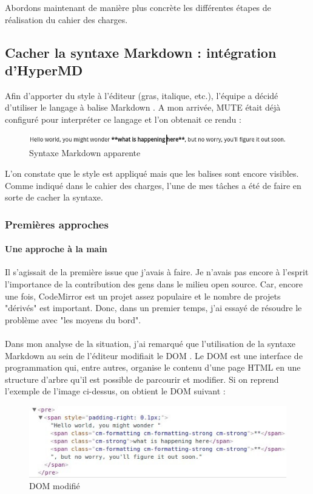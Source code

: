 \documentclass[12pt]{article}
\begin{document}
\newpage
Abordons maintenant de manière plus concrète les différentes étapes de réalisation du cahier des charges.\\

\subsection{Cacher la syntaxe Markdown : intégration d'HyperMD}
Afin d'apporter du style à l'éditeur (gras, italique, etc.), l'équipe a décidé d'utiliser le langage à balise Markdown \cite{markdown}. A mon arrivée, MUTE était déjà configuré pour interpréter ce langage et l'on obtenait ce rendu :

\begin{figure}[H]
    \centering
    \includegraphics[scale=0.65]{gallery/style_example.jpg}
    \caption[nom dans le sommaire]{Syntaxe Markdown apparente}
    \label{fig:gallery3}
\end{figure}

L'on constate que le style est appliqué mais que les balises sont encore visibles. Comme indiqué dans le cahier des charges, l'une de mes tâches a été de faire en sorte de cacher la syntaxe.

\subsubsection{Premières approches}
\paragraph{Une approche à la main}
Il s'agissait de la première issue que j'avais à faire. Je n'avais pas encore à l'esprit l'importance de la contribution des gens dans le milieu open source. Car, encore une fois, CodeMirror est un projet assez populaire et le nombre de projets "dérivés" est important. Donc, dans un premier temps, j'ai essayé de résoudre le problème avec "les moyens du bord".
\paragraph{}
Dans mon analyse de la situation, j'ai remarqué que l'utilisation de la syntaxe Markdown au sein de l'éditeur modifiait le DOM \cite{dom}. Le DOM est une interface de programmation qui, entre autres, organise le contenu d'une page HTML en une structure d'arbre qu'il est possible de parcourir et modifier. Si on reprend l'exemple de l'image ci-dessus, on obtient le DOM suivant :
\begin{figure}[H]
    \centering
    \includegraphics[scale=0.95]{gallery/modified_dom.jpg}
    \caption[nom dans le sommaire]{DOM modifié}
    \label{fig:gallery4}
\end{figure}
\end{document}

